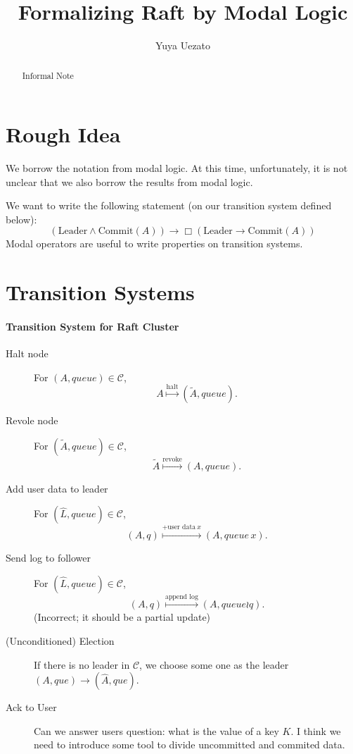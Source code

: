 \documentclass[sigconf,nonacm]{acmart}
\title{Formalizing Raft by Modal Logic}
\author{Yuya Uezato}
\begin{document}
\begin{abstract}
Informal Note
\end{abstract}

\maketitle

\section{Rough Idea}

We borrow the notation from modal logic.
At this time, unfortunately, it is not unclear that we also borrow the results from modal logic.

We want to write the following statement (on our transition system defined below):
\[
(\text{Leader} \land \text{Commit}(A)) \to \Box(\text{Leader} \to \text{Commit}(A))
\]
Modal operators are useful to write properties on transition systems.

\section{Transition Systems}

\paragraph{Transition System for Raft Cluster}
\begin{description}
\item[Halt node] For $(A, \mathit{queue}) \in \mathcal{C}$,
\[
A \overset{\text{halt}}{\mapsto} (\tilde{A}, \mathit{queue}).
\]
%
\item[Revole node] For $(\tilde{A}, \mathit{queue}) \in \mathcal{C}$,
\[
\tilde{A} \overset{\text{revoke}}{\mapsto} (A, \mathit{queue}).
\]
%
\item[Add user data to leader] For $(\hat{L}, \mathit{queue}) \in \mathcal{C}$,
\[
(A, \mathit{q}) \overset{\text{+user data}\ x}{\mapsto} (A, \mathit{queue}\,x).
\]
%
\item[Send log to follower] For $(\hat{L}, \mathit{queue}) \in \mathcal{C}$,
\[
(A, \mathit{q}) \overset{\text{append log}}{\mapsto} (A, \mathit{queue} \wr \mathit{q} ).
\]
(Incorrect; it should be a partial update)
%
\item[(Unconditioned) Election] If there is no leader in $\mathcal{C}$, we choose some one as the leader $(A, \mathit{que}) \to (\hat{A}, \mathit{que})$.
%
\item[Ack to User] Can we answer users question: what is the value of a key $K$.
I think we need to introduce some tool to divide uncommitted and commited data.
\end{description}
\end{document}
